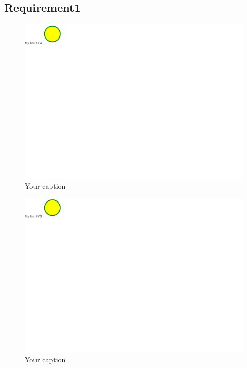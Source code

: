 \documentclass{article}
\begin{document}
	\subsection{Requirement1}
		\begin{figure}[h!]
		    \centering
		    \captionsetup{labelformat=empty}
		    \caption{Your caption}
		    \includegraphics[width=\textwidth, angle=0]{Kreis2.pdf}
		\end{figure}
		\newpage
		\begin{figure}[h!]
		    \centering
		    \captionsetup{labelformat=empty}
		    \caption{Your caption}
		    \includegraphics[width=\textwidth, angle=0]{Kreis2.pdf}
		\end{figure}
		\newpage
	
\end{document}
